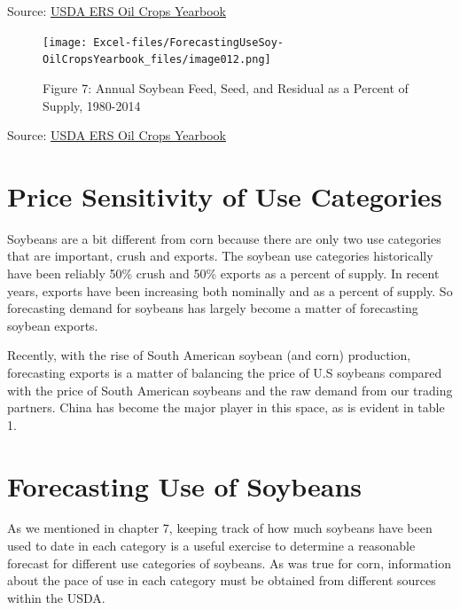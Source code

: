 \documentclass[
  letterpaper,
  DIV=11,
  numbers=noendperiod]{scrreprt}
\begin{document}
Source:
\href{http://www.ers.usda.gov/data-products/oil-crops-yearbook.aspx}{USDA
ERS Oil Crops Yearbook}

\begin{figure}

{\centering \texttt{[image: Excel-files/ForecastingUseSoy-OilCropsYearbook\_files/image012.png]}

}

\caption{Figure 7: Annual Soybean Feed, Seed, and Residual as a Percent
of Supply, 1980-2014}

\end{figure}

Source:
\href{http://www.ers.usda.gov/data-products/oil-crops-yearbook.aspx}{USDA
ERS Oil Crops Yearbook}

\hypertarget{price-sensitivity-of-use-categories-1}{%
\section{Price Sensitivity of Use
Categories}\label{price-sensitivity-of-use-categories-1}}

Soybeans are a bit different from corn because there are only two use
categories that are important, crush and exports. The soybean use
categories historically have been reliably 50\% crush and 50\% exports
as a percent of supply. In recent years, exports have been increasing
both nominally and as a percent of supply. So forecasting demand for
soybeans has largely become a matter of forecasting soybean exports.

Recently, with the rise of South American soybean (and corn) production,
forecasting exports is a matter of balancing the price of U.S soybeans
compared with the price of South American soybeans and the raw demand
from our trading partners. China has become the major player in this
space, as is evident in table 1.

\hypertarget{forecasting-use-of-soybeans-1}{%
\section{Forecasting Use of
Soybeans}\label{forecasting-use-of-soybeans-1}}

As we mentioned in chapter 7, keeping track of how much soybeans have
been used to date in each category is a useful exercise to determine a
reasonable forecast for different use categories of soybeans. As was
true for corn, information about the pace of use in each category must
be obtained from different sources within the USDA.
\end{document}
